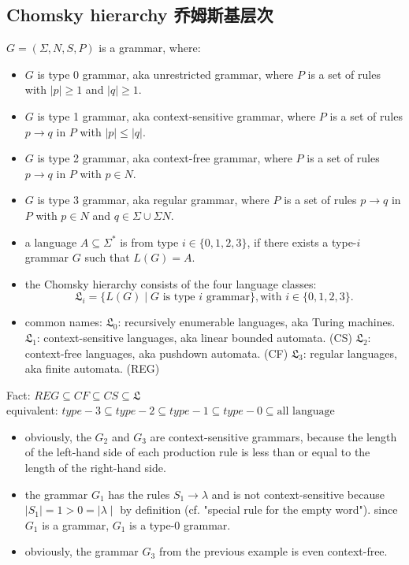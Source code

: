 \documentclass[a4paper,11pt,utf8]{article}
\newcommand{\lineindent}{\hspace*{\parindent}}
\begin{document}
\subsection{Chomsky hierarchy 乔姆斯基层次}
\begin{tcolorbox}[title=Chomsky hierarchy,colback=white,colframe=black,width=\textwidth,arc=0pt]
    $G = (\Sigma,N,S,P)$ is a grammar, where:
    \begin{itemize}
        \item $G$ is type 0 grammar, aka unrestricted grammar, where $P$ is a set of rules with $|p| \geq 1$ and $|q| \geq 1$.
        \item $G$ is type 1 grammar, aka context-sensitive grammar, where $P$ is a set of rules $p \to q$ in $P$ with $|p| \leq |q|$.
        \item $G$ is type 2 grammar, aka context-free grammar, where $P$ is a set of rules $p \to q$ in $P$ with $p \in N$.
        \item $G$ is type 3 grammar, aka regular grammar, where $P$ is a set of rules $p \to q$ in $P$ with $p \in N$ and $q \in \Sigma \cup \Sigma N$.
        \item a language $A \subseteq \Sigma^*$ is from type $i \in \{0,1,2,3\}$, if there exists a type-$i$ grammar $G$ such that $L(G) = A$.
        \item the Chomsky hierarchy consists of the four language classes: \[
            \mathfrak{L}_i = \{L(G) \mid G \text{ is type } i \text{ grammar}\}, \text{with } i \in \{0,1,2,3\}.
        \]
        \item common names:
        \subitem $\mathfrak{L}_0$: recursively enumerable languages, aka Turing machines.
        \subitem $\mathfrak{L}_1$: context-sensitive languages, aka linear bounded automata. (CS)
        \subitem $\mathfrak{L}_2$: context-free languages, aka pushdown automata. (CF)
        \subitem $\mathfrak{L}_3$: regular languages, aka finite automata. (REG)
    \end{itemize}
\end{tcolorbox}
Fact: $REG \subseteq CF \subseteq CS \subseteq \mathfrak{L}$ \\
\lineindent equivalent: $type-3 \subseteq type-2 \subseteq type-1 \subseteq type-0 \subseteq \text{all language}$ \\
\begin{tcolorbox}[title=example,colback=white,colframe=black,width=\textwidth,arc=0pt]
    \begin{itemize}
        \item obviously, the $G_2$ and $G_3$ are context-sensitive grammars, because the length of the left-hand side of each production rule is less than or equal to the length of the right-hand side.
        \item the grammar $G_1$ has the rules $S_1 \to \lambda$ and is not context-sensitive because $\mid S_1 \mid = 1 > 0 = \mid \lambda \mid$ by definition (cf. "special rule for the empty word"). since $G_1$ is a grammar, $G_1$ is a type-0 grammar.
        \item obviously, the grammar $G_3$ from the previous example is even context-free.
    \end{itemize}
\end{tcolorbox}
\end{document}
